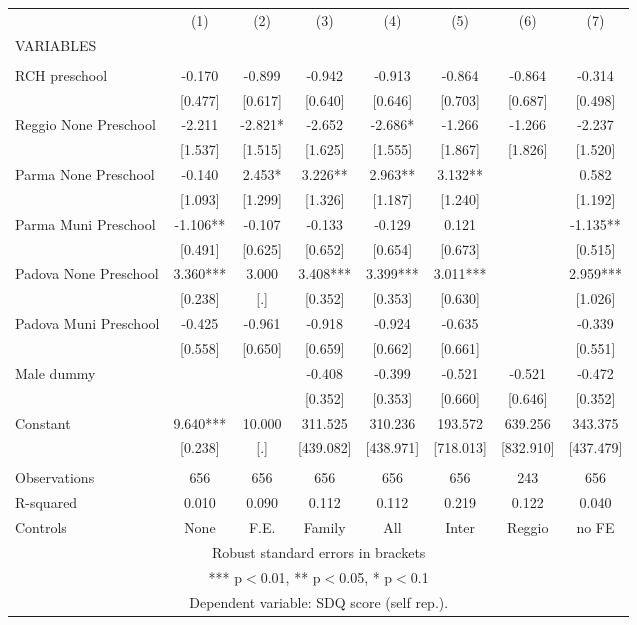 \begin{tabular}{lccccccc} \hline
 & (1) & (2) & (3) & (4) & (5) & (6) & (7) \\
VARIABLES &  &  &  &  &  &  &  \\ \hline
 &  &  &  &  &  &  &  \\
RCH preschool & -0.170 & -0.899 & -0.942 & -0.913 & -0.864 & -0.864 & -0.314 \\
 & [0.477] & [0.617] & [0.640] & [0.646] & [0.703] & [0.687] & [0.498] \\
Reggio None Preschool & -2.211 & -2.821* & -2.652 & -2.686* & -1.266 & -1.266 & -2.237 \\
 & [1.537] & [1.515] & [1.625] & [1.555] & [1.867] & [1.826] & [1.520] \\
Parma None Preschool & -0.140 & 2.453* & 3.226** & 2.963** & 3.132** &  & 0.582 \\
 & [1.093] & [1.299] & [1.326] & [1.187] & [1.240] &  & [1.192] \\
Parma Muni Preschool & -1.106** & -0.107 & -0.133 & -0.129 & 0.121 &  & -1.135** \\
 & [0.491] & [0.625] & [0.652] & [0.654] & [0.673] &  & [0.515] \\
Padova None Preschool & 3.360*** & 3.000 & 3.408*** & 3.399*** & 3.011*** &  & 2.959*** \\
 & [0.238] & [.] & [0.352] & [0.353] & [0.630] &  & [1.026] \\
Padova Muni Preschool & -0.425 & -0.961 & -0.918 & -0.924 & -0.635 &  & -0.339 \\
 & [0.558] & [0.650] & [0.659] & [0.662] & [0.661] &  & [0.551] \\
Male dummy &  &  & -0.408 & -0.399 & -0.521 & -0.521 & -0.472 \\
 &  &  & [0.352] & [0.353] & [0.660] & [0.646] & [0.352] \\
Constant & 9.640*** & 10.000 & 311.525 & 310.236 & 193.572 & 639.256 & 343.375 \\
 & [0.238] & [.] & [439.082] & [438.971] & [718.013] & [832.910] & [437.479] \\
 &  &  &  &  &  &  &  \\
Observations & 656 & 656 & 656 & 656 & 656 & 243 & 656 \\
R-squared & 0.010 & 0.090 & 0.112 & 0.112 & 0.219 & 0.122 & 0.040 \\
 Controls & None & F.E. & Family & All & Inter & Reggio & no FE \\ \hline
\multicolumn{8}{c}{ Robust standard errors in brackets} \\
\multicolumn{8}{c}{ *** p$<$0.01, ** p$<$0.05, * p$<$0.1} \\
\multicolumn{8}{c}{ Dependent variable: SDQ score (self rep.).} \\
\end{tabular}
